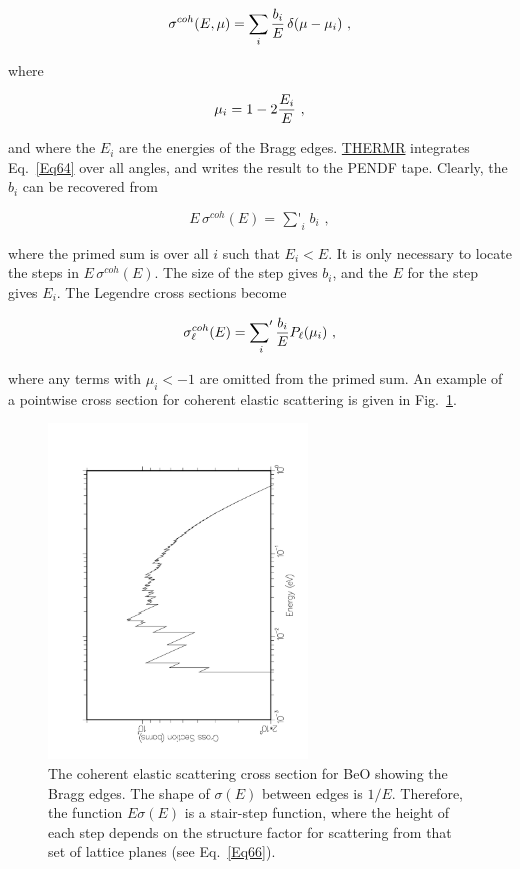   \begin{equation}
    \sigma^{coh}(E,\mu)=\sum_i {{b_i} \over {E}}
    \,\delta(\mu-\mu_i)\,\,,
  \label{Eq64}
  \end{equation}

\noindent
where

  \begin{equation}
    \mu_i=1-2{{E_i} \over {E}}\,\,,
  \end{equation}

\noindent
and where the $E_i$ are the energies of the Bragg
edges.  \hyperlink{sTHERMRhy}{THERMR}
integrates Eq.~\ref{Eq64} over all angles, and writes the result
to the PENDF tape.  Clearly, the $b_i$ can be recovered from

  \begin{equation}
    E\,\sigma^{coh}(E)=\mathop{{\sum}'}_i b_i\,\,,
  \label{Eq66}
  \end{equation}
\vspace{1 pt}

\noindent
where the primed sum is over all $i$ such that $E_i <E$.  It is only
necessary to locate the steps in $E\,\sigma^{coh}(E)$.  The size of the
step gives $b_i$, and the $E$ for the step gives $E_i$.  The Legendre
cross sections become

  \begin{equation}
    \sigma^{coh}_\ell (E)=\mathop{{\sum}'}_i {{b_i} \over {E}}
     P_\ell (\mu_i)\,\,,
  \label{Eq67}
  \end{equation}

\noindent
where any terms with $\mu_i{<}-1$ are omitted from the primed sum.
An example of a pointwise cross section for coherent elastic scattering
is given in Fig.~\ref{gr4}.

\begin{figure}[thb]\centering
\includegraphics[keepaspectratio, height=3.5in, angle=270]{figs/groupr4ack}
\caption[Bragg edges seen in the BeO coherent elastic scattering cross section]
{The coherent elastic scattering cross section for BeO showing the Bragg edges.
 The shape of $\sigma(E)$ between edges is $1/E$.  Therefore, the function
 $E\sigma(E)$ is a stair-step function, where the height of each step depends
 on the structure factor for
 scattering from that set of lattice planes (see Eq.~\ref{Eq66}).}
\label{gr4}
\end{figure}

